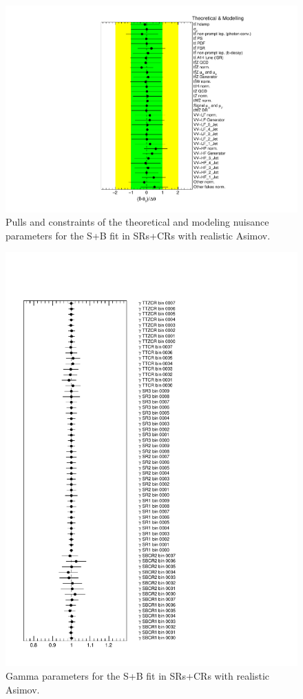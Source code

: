 \begin{figure}[htbp]
	\centering
	\includegraphics[width=.85\textwidth]{Chapters/CH8/figures/SPLUSB_CRSR_UsingDL1rcFullSys/NuisPar_Theoretical_&_Modelling}
	\caption{Pulls and constraints of the theoretical and modeling nuisance parameters for the S+B \tZc fit in SRs+CRs with realistic Asimov.}%
	\label{fig:stat:tzc:splusb:crsr:np:model}
\end{figure}

\begin{figure}[htbp]
	\centering
	\includegraphics[width=.85\textwidth]{Chapters/CH8/figures/SPLUSB_CRSR_UsingDL1rcFullSys/Gammas}
	\caption{Gamma parameters for the S+B \tZc fit in SRs+CRs with realistic Asimov.}%
	\label{fig:stat:tzc:splusb:crsr:gamma}
\end{figure}

